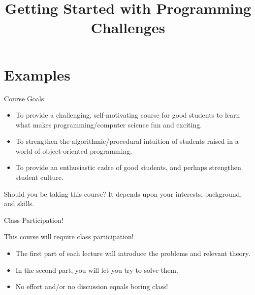 \documentclass{beamer}
\title[Getting Started with Prog. Challenges]{Getting Started with Programming Challenges}
\begin{document}
\frame{
  \titlepage
}
 
\section{Examples}


\begin{frame}[fragile]{Course Goals}
  \begin{itemize}
  \item To provide a challenging, self-motivating course for good students to learn what makes programming/computer science fun and exciting.
\item To strengthen the algorithmic/procedural intuition of students raised in a world of object-oriented programming.
\item To provide an enthusiastic cadre of good students, and perhaps strengthen student culture.
\end{itemize}

\begin{alertblock}{Should you be taking this course?}
  It depends upon your interests, background, and skills.
\end{alertblock}
\end{frame}


\begin{frame}{Class Participation!}
  \begin{alertblock}{This course will require class participation!}
    \begin{itemize}
    \item The first part of each lecture will introduce the problems and relevant theory.
    \item In the second part, you will let you try to solve them.
    \item<alert@1> No effort and/or no discussion equals boring class!
    \end{itemize}
  \end{alertblock}


\end{frame}

\end{document}
